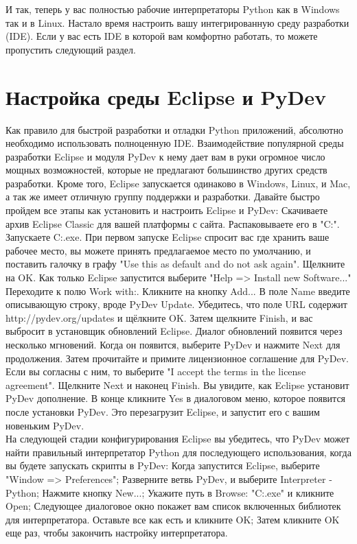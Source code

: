 \documentclass[12pt, a4paper, oneside]{book}
\begin{document}
И так, теперь у вас полностью рабочие интерпретаторы Python как в Windows так и в Linux. Настало время настроить вашу интегрированную среду разработки (IDE). Если у вас есть IDE в которой вам комфортно работать, то можете пропустить следующий раздел.\\


\section{Настройка среды Eclipse и PyDev}

Как правило для быстрой разработки и отладки Python приложений, абсолютно необходимо использовать полноценную IDE. Взаимодействие популярной среды разработки Eclipse и модуля PyDev к нему дает вам в руки огромное число мощных возможностей, которые не предлагают большинство других средств разработки. Кроме того, Eclipse запускается одинаково в Windows, Linux, и Mac, а так же имеет отличную группу поддержки и разработки. Давайте быстро пройдем все этапы как установить и настроить Eclipse и PyDev:
Скачиваете архив Eclipse Classic для вашей платформы с сайта.
Распаковываете его в "C:\Eclipse".
Запускаете C:\Eclipse\eclipse.exe.
При первом запуске Eclipse спросит вас где хранить ваше рабочее место, вы можете принять предлагаемое место по умолчанию, и поставить галочку в графу "Use this as default and do not ask again". Щелкните на OK.
Как только Eclipse запустится выберите "Help => Install new Software..."
Переходите к полю Work with:.
Кликните на кнопку Add...
В поле Name введите описывающую строку, вроде PyDev Update. Убедитесь, что поле URL содержит http://pydev.org/updates и щёлкните OK. Затем щелкните Finish, и вас выбросит в установщик обновлений Eclipse.
Диалог обновлений появится через несколько мгновений. Когда он появится, выберите PyDev и нажмите Next для продолжения.
Затем прочитайте и примите лицензионное соглашение для PyDev. Если вы согласны с ним, то выберите "I accept the terms in the license agreement".
Щелкните Next и наконец Finish. Вы увидите, как Eclipse установит PyDev дополнение.
В конце кликните Yes в диалоговом меню, которое появится после установки PyDev. Это перезагрузит Eclipse, и запустит его с вашим новеньким PyDev.\\

На следующей стадии конфигурирования Eclipse вы убедитесь, что PyDev может найти правильный интерпретатор Python для последующего использования, когда вы будете запускать скрипты в PyDev:
Когда запустится Eclipse, выберите "Window => Preferences";
Разверните ветвь PyDev, и выберите Interpreter - Python;
Нажмите кнопку New...;
Укажите путь в Browse: "C:\python.exe" и кликните Open;
Следующее диалоговое окно покажет вам список включенных библиотек для интерпретатора. Оставьте все как есть и кликните OK;
Затем кликните OK еще раз, чтобы закончить настройку интерпретатора.\\
\end{document}
